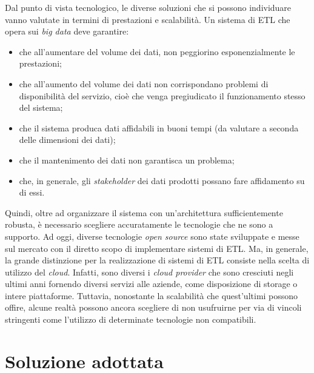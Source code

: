 Dal punto di vista tecnologico, le diverse soluzioni che si possono individuare vanno valutate in termini di prestazioni e scalabilità.
Un sistema di ETL che opera sui \textit{big data} deve garantire:
\begin{itemize}
    \item che all'aumentare del volume dei dati, non peggiorino esponenzialmente le prestazioni;
    \item che all'aumento del volume dei dati non corrispondano problemi di disponibilità del servizio, cioè che venga pregiudicato il funzionamento stesso del sistema;
    \item che il sistema produca dati affidabili in buoni tempi (da valutare a seconda delle dimensioni dei dati);
    \item che il mantenimento dei dati non garantisca un problema;
    \item che, in generale, gli \textit{stakeholder} dei dati prodotti possano fare affidamento su di essi.
\end{itemize}
Quindi, oltre ad organizzare il sistema con un'architettura sufficientemente robusta, è necessario scegliere accuratamente le tecnologie che ne sono a supporto.
Ad oggi, diverse tecnologie \textit{open source} sono state sviluppate e messe sul mercato con il diretto scopo di implementare sistemi di ETL.
Ma, in generale, la grande distinzione per la realizzazione di sistemi di ETL consiste nella scelta di utilizzo del \textit{cloud}.
Infatti, sono diversi i \textit{cloud provider} che sono cresciuti negli ultimi anni fornendo diversi servizi alle aziende, come disposizione di storage o intere piattaforme.
Tuttavia, nonostante la scalabilità che quest'ultimi possono offire, alcune realtà possono ancora scegliere di non usufruirne per via di vincoli stringenti come l'utilizzo di determinate tecnologie non compatibili.

\section{Soluzione adottata}\label{sec:solution}

